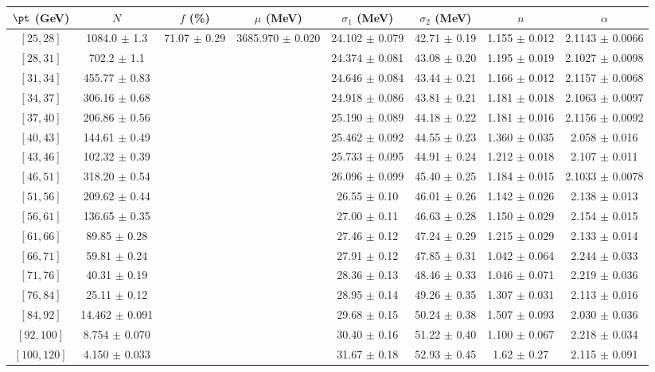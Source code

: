 \begin{tabular}{c||c|c|c|c|c|c|c}
$\pt$ (GeV) & $N$ & $f$ (\%) & $\mu$ (MeV) & $\sigma_1$ (MeV) & $\sigma_2$ (MeV) & $n$ & $\alpha$ \\
\hline
$[25, 28]$ & 1084.0 $\pm$ 1.3 & \multirow{17}{*}{71.07 $\pm$ 0.29} & \multirow{17}{*}{3685.970 $\pm$ 0.020} & 24.102 $\pm$ 0.079 & 42.71 $\pm$ 0.19 & 1.155 $\pm$ 0.012 & 2.1143 $\pm$ 0.0066\\
$[28, 31]$ & 702.2 $\pm$ 1.1 &  &  & 24.374 $\pm$ 0.081 & 43.08 $\pm$ 0.20 & 1.195 $\pm$ 0.019 & 2.1027 $\pm$ 0.0098\\
$[31, 34]$ & 455.77 $\pm$ 0.83 &  &  & 24.646 $\pm$ 0.084 & 43.44 $\pm$ 0.21 & 1.166 $\pm$ 0.012 & 2.1157 $\pm$ 0.0068\\
$[34, 37]$ & 306.16 $\pm$ 0.68 &  &  & 24.918 $\pm$ 0.086 & 43.81 $\pm$ 0.21 & 1.181 $\pm$ 0.018 & 2.1063 $\pm$ 0.0097\\
$[37, 40]$ & 206.86 $\pm$ 0.56 &  &  & 25.190 $\pm$ 0.089 & 44.18 $\pm$ 0.22 & 1.181 $\pm$ 0.016 & 2.1156 $\pm$ 0.0092\\
$[40, 43]$ & 144.61 $\pm$ 0.49 &  &  & 25.462 $\pm$ 0.092 & 44.55 $\pm$ 0.23 & 1.360 $\pm$ 0.035 & 2.058 $\pm$ 0.016\\
$[43, 46]$ & 102.32 $\pm$ 0.39 &  &  & 25.733 $\pm$ 0.095 & 44.91 $\pm$ 0.24 & 1.212 $\pm$ 0.018 & 2.107 $\pm$ 0.011\\
$[46, 51]$ & 318.20 $\pm$ 0.54 &  &  & 26.096 $\pm$ 0.099 & 45.40 $\pm$ 0.25 & 1.184 $\pm$ 0.015 & 2.1033 $\pm$ 0.0078\\
$[51, 56]$ & 209.62 $\pm$ 0.44 &  &  & 26.55 $\pm$ 0.10 & 46.01 $\pm$ 0.26 & 1.142 $\pm$ 0.026 & 2.138 $\pm$ 0.013\\
$[56, 61]$ & 136.65 $\pm$ 0.35 &  &  & 27.00 $\pm$ 0.11 & 46.63 $\pm$ 0.28 & 1.150 $\pm$ 0.029 & 2.154 $\pm$ 0.015\\
$[61, 66]$ & 89.85 $\pm$ 0.28 &  &  & 27.46 $\pm$ 0.12 & 47.24 $\pm$ 0.29 & 1.215 $\pm$ 0.029 & 2.133 $\pm$ 0.014\\
$[66, 71]$ & 59.81 $\pm$ 0.24 &  &  & 27.91 $\pm$ 0.12 & 47.85 $\pm$ 0.31 & 1.042 $\pm$ 0.064 & 2.244 $\pm$ 0.033\\
$[71, 76]$ & 40.31 $\pm$ 0.19 &  &  & 28.36 $\pm$ 0.13 & 48.46 $\pm$ 0.33 & 1.046 $\pm$ 0.071 & 2.219 $\pm$ 0.036\\
$[76, 84]$ & 25.11 $\pm$ 0.12 &  &  & 28.95 $\pm$ 0.14 & 49.26 $\pm$ 0.35 & 1.307 $\pm$ 0.031 & 2.113 $\pm$ 0.016\\
$[84, 92]$ & 14.462 $\pm$ 0.091 &  &  & 29.68 $\pm$ 0.15 & 50.24 $\pm$ 0.38 & 1.507 $\pm$ 0.093 & 2.030 $\pm$ 0.036\\
$[92, 100]$ & 8.754 $\pm$ 0.070 &  &  & 30.40 $\pm$ 0.16 & 51.22 $\pm$ 0.40 & 1.100 $\pm$ 0.067 & 2.218 $\pm$ 0.034\\
$[100, 120]$ & 4.150 $\pm$ 0.033 &  &  & 31.67 $\pm$ 0.18 & 52.93 $\pm$ 0.45 & 1.62 $\pm$ 0.27 & 2.115 $\pm$ 0.091\\
\end{tabular}
